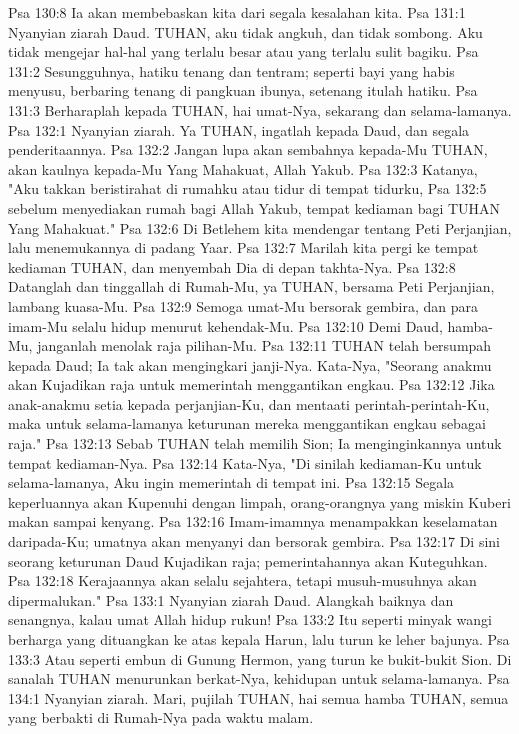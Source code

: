 Psa 130:8  Ia akan membebaskan kita dari segala kesalahan kita.
Psa 131:1  Nyanyian ziarah Daud. TUHAN, aku tidak angkuh, dan tidak sombong. Aku tidak mengejar hal-hal yang terlalu besar atau yang terlalu sulit bagiku.
Psa 131:2  Sesungguhnya, hatiku tenang dan tentram; seperti bayi yang habis menyusu, berbaring tenang di pangkuan ibunya, setenang itulah hatiku.
Psa 131:3  Berharaplah kepada TUHAN, hai umat-Nya, sekarang dan selama-lamanya.
Psa 132:1  Nyanyian ziarah. Ya TUHAN, ingatlah kepada Daud, dan segala penderitaannya.
Psa 132:2  Jangan lupa akan sembahnya kepada-Mu TUHAN, akan kaulnya kepada-Mu Yang Mahakuat, Allah Yakub.
Psa 132:3  Katanya, "Aku takkan beristirahat di rumahku atau tidur di tempat tidurku,
Psa 132:5  sebelum menyediakan rumah bagi Allah Yakub, tempat kediaman bagi TUHAN Yang Mahakuat."
Psa 132:6  Di Betlehem kita mendengar tentang Peti Perjanjian, lalu menemukannya di padang Yaar.
Psa 132:7  Marilah kita pergi ke tempat kediaman TUHAN, dan menyembah Dia di depan takhta-Nya.
Psa 132:8  Datanglah dan tinggallah di Rumah-Mu, ya TUHAN, bersama Peti Perjanjian, lambang kuasa-Mu.
Psa 132:9  Semoga umat-Mu bersorak gembira, dan para imam-Mu selalu hidup menurut kehendak-Mu.
Psa 132:10  Demi Daud, hamba-Mu, janganlah menolak raja pilihan-Mu.
Psa 132:11  TUHAN telah bersumpah kepada Daud; Ia tak akan mengingkari janji-Nya. Kata-Nya, "Seorang anakmu akan Kujadikan raja untuk memerintah menggantikan engkau.
Psa 132:12  Jika anak-anakmu setia kepada perjanjian-Ku, dan mentaati perintah-perintah-Ku, maka untuk selama-lamanya keturunan mereka menggantikan engkau sebagai raja."
Psa 132:13  Sebab TUHAN telah memilih Sion; Ia menginginkannya untuk tempat kediaman-Nya.
Psa 132:14  Kata-Nya, "Di sinilah kediaman-Ku untuk selama-lamanya, Aku ingin memerintah di tempat ini.
Psa 132:15  Segala keperluannya akan Kupenuhi dengan limpah, orang-orangnya yang miskin Kuberi makan sampai kenyang.
Psa 132:16  Imam-imamnya menampakkan keselamatan daripada-Ku; umatnya akan menyanyi dan bersorak gembira.
Psa 132:17  Di sini seorang keturunan Daud Kujadikan raja; pemerintahannya akan Kuteguhkan.
Psa 132:18  Kerajaannya akan selalu sejahtera, tetapi musuh-musuhnya akan dipermalukan."
Psa 133:1  Nyanyian ziarah Daud. Alangkah baiknya dan senangnya, kalau umat Allah hidup rukun!
Psa 133:2  Itu seperti minyak wangi berharga yang dituangkan ke atas kepala Harun, lalu turun ke leher bajunya.
Psa 133:3  Atau seperti embun di Gunung Hermon, yang turun ke bukit-bukit Sion. Di sanalah TUHAN menurunkan berkat-Nya, kehidupan untuk selama-lamanya.
Psa 134:1  Nyanyian ziarah. Mari, pujilah TUHAN, hai semua hamba TUHAN, semua yang berbakti di Rumah-Nya pada waktu malam.
